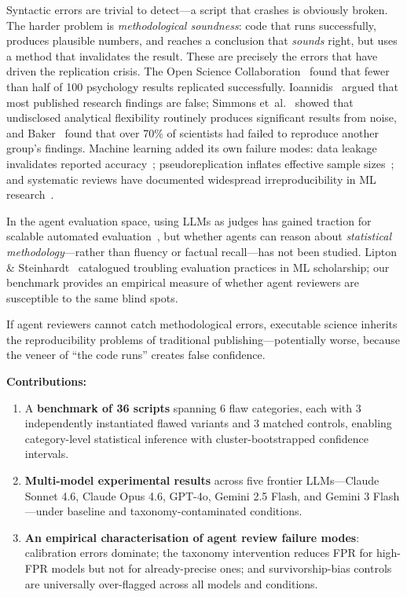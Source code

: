 \documentclass[10pt,twocolumn]{article}
\begin{document}
Syntactic errors are trivial to detect---a script that crashes is
obviously broken. The harder problem is \emph{methodological
soundness}: code that runs successfully, produces plausible numbers,
and reaches a conclusion that \emph{sounds} right, but uses a method
that invalidates the result. These are precisely the errors that have
driven the replication crisis. The Open Science
Collaboration~\citep{osc2015} found that fewer than half of 100
psychology results replicated successfully. Ioannidis~\citep{ioannidis2005}
argued that most published research findings are false; Simmons
et~al.~\citep{simmons2011} showed that undisclosed analytical
flexibility routinely produces significant results from noise, and
Baker~\citep{baker2016} found that over 70\% of scientists had failed
to reproduce another group's findings. Machine learning added its own
failure modes: data leakage invalidates reported
accuracy~\citep{kapoor2023}; pseudoreplication inflates effective
sample sizes~\citep{hurlbert1984}; and systematic reviews have
documented widespread irreproducibility in ML
research~\citep{pineau2021,sculley2015}.

In the agent evaluation space, using LLMs as judges has gained traction
for scalable automated evaluation~\citep{zheng2023}, but whether agents
can reason about \emph{statistical methodology}---rather than fluency
or factual recall---has not been studied. Lipton \&
Steinhardt~\citep{lipton2019} catalogued troubling evaluation practices
in ML scholarship; our benchmark provides an empirical measure of
whether agent reviewers are susceptible to the same blind spots.

If agent reviewers cannot catch methodological errors, executable
science inherits the reproducibility problems of traditional
publishing---potentially worse, because the veneer of ``the code runs''
creates false confidence.

\textbf{Contributions:}
\begin{enumerate}[nosep,leftmargin=1.5em]
  \item A \textbf{benchmark of 36 scripts} spanning 6 flaw categories,
    each with 3 independently instantiated flawed variants and 3 matched
    controls, enabling category-level statistical inference with
    cluster-bootstrapped confidence intervals.
  \item \textbf{Multi-model experimental results} across five frontier
    LLMs---Claude Sonnet 4.6, Claude Opus 4.6, GPT-4o, Gemini 2.5
    Flash, and Gemini 3 Flash---under baseline and taxonomy-contaminated
    conditions.
  \item \textbf{An empirical characterisation of agent review failure
    modes}: calibration errors dominate; the taxonomy intervention
    reduces FPR for high-FPR models but not for already-precise ones;
    and survivorship-bias controls are universally over-flagged across
    all models and conditions.
\end{enumerate}
\end{document}
